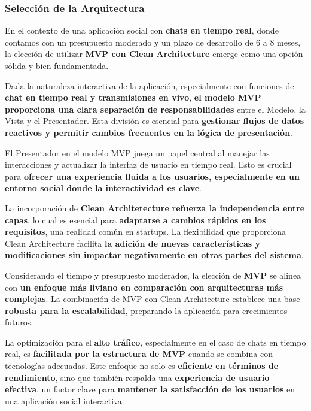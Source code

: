 \documentclass[a4paper]{article}
\begin{document}
    \subsubsection{Selección de la Arquitectura}

    En el contexto de una aplicación social con \textbf{chats en tiempo real}, donde contamos con un presupuesto moderado y un plazo de desarrollo de 6 a 8 meses, la elección de utilizar \textbf{MVP con Clean Architecture} emerge como una opción sólida y bien fundamentada.\vspace{0.3cm}

    Dada la naturaleza interactiva de la aplicación, especialmente con funciones de \textbf{chat en tiempo real y transmisiones en vivo}, \textbf{el modelo MVP proporciona una clara separación de responsabilidades} entre el Modelo, la Vista y el Presentador. Esta división es esencial para \textbf{gestionar flujos de datos reactivos y permitir cambios frecuentes en la lógica de presentación}.\vspace{0.3cm}
    
    El Presentador en el modelo MVP juega un papel central al manejar las interacciones y actualizar la interfaz de usuario en tiempo real. Esto es crucial para \textbf{ofrecer una experiencia fluida a los usuarios, especialmente en un entorno social donde la interactividad es clave}.\vspace{0.3cm}
    
    La incorporación de \textbf{Clean Architetecture} \textbf{refuerza la independencia entre capas}, lo cual es esencial para \textbf{adaptarse a cambios rápidos en los requisitos}, una realidad común en startups. La flexibilidad que proporciona Clean Architecture facilita \textbf{la adición de nuevas características y modificaciones sin impactar negativamente en otras partes del sistema}.\vspace{0.3cm}
    
    Considerando el tiempo y presupuesto moderados, la elección de \textbf{MVP} se alinea con \textbf{un enfoque más liviano en comparación con arquitecturas más complejas}. La combinación de MVP con Clean Architecture establece una base \textbf{robusta para la escalabilidad}, preparando la aplicación para crecimientos futuros.\vspace{0.3cm}
    
    La optimización para el \textbf{alto tráfico}, especialmente en el caso de chats en tiempo real, es \textbf{facilitada por la estructura de MVP} cuando se combina con tecnologías adecuadas. Este enfoque no solo es \textbf{eficiente en términos de rendimiento}, sino que también respalda una \textbf{experiencia de usuario efectiva}, un factor clave para \textbf{mantener la satisfacción de los usuarios} en una aplicación social interactiva.\vspace{0.3cm}
    
\end{document}
